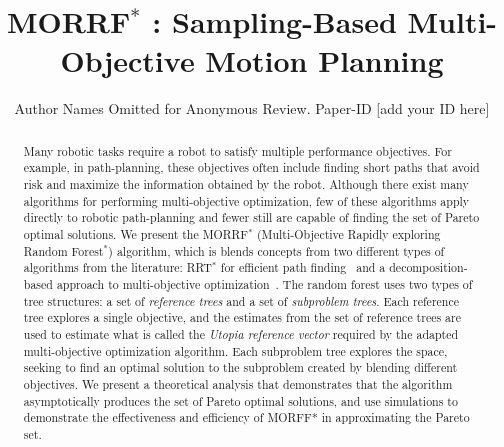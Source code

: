 \documentclass[conference]{IEEEtran}
\begin{document}
\title{ MORRF$^{*}$ : Sampling-Based Multi-Objective Motion Planning }

\author{Author Names Omitted for Anonymous Review. Paper-ID [add your ID here]}

\maketitle

\begin{abstract}
%

Many robotic tasks require a robot to satisfy multiple performance objectives.  
For example, in path-planning, these objectives often include finding short paths that avoid risk and maximize the information obtained by the robot.  
Although there exist many algorithms for performing multi-objective optimization, few of these algorithms apply directly to robotic path-planning and fewer still are capable of finding the set of Pareto optimal solutions.  
We present the MORRF$^{*}$ (Multi-Objective Rapidly exploring Random Forest$^{*}$) algorithm, which is blends concepts from two different types of algorithms from the literature: RRT$^{*}$ for efficient path finding~\cite{Karaman.Frazzoli:RSS10} and a decomposition-based approach to multi-objective optimization~\cite{4358754}.  
The random forest uses two types of tree structures: a set of {\em reference trees} and a set of {\em subproblem trees}.  
Each reference tree explores a single objective, and the estimates from the set of reference trees are used to estimate what is called the {\em Utopia reference vector} required by the adapted multi-objective optimization algorithm.  
Each subproblem tree explores the space, seeking to find an optimal solution to the subproblem created by blending different objectives.  
We present a theoretical analysis that demonstrates that the algorithm asymptotically produces the set of Pareto optimal solutions, and use simulations to demonstrate the effectiveness and efficiency of MORFF* in approximating the Pareto set.
\end{abstract}
\end{document}
